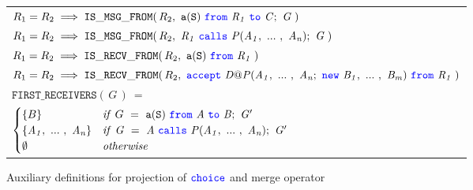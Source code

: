 \documentclass[12pt,twoside]{report}
\begin{document}
\begin{figure}[h!]
    \begin{center}
        \begin{tabular}{l}






            $R_1 = R_2 \implies \mathtt{IS\_MSG\_FROM}(\,R_2,\ \contG{\messageG{a}{S}{R_1}{C}}{G}\;)$\\[7pt]

            $R_1 = R_2 \implies \mathtt{IS\_MSG\_FROM}(\,R_2,\ \contG{\callsG{R_1}{P}{A}}{G}\;)$\\[14pt]

            $R_1 = R_2 \implies \mathtt{IS\_RECV\_FROM}(\,R_2,\ \messageFromL{a}{S}{R_1}\;)$\\[7pt]

            $R_1 = R_2 \implies \mathtt{IS\_RECV\_FROM}(\,R_2,\ \acceptL{D@P}{A}{B}{R_1}\;)$\\[14pt]

            $\mathtt{FIRST\_RECEIVERS}(\,G\,)\ =$\\

            \begin{math}
                \begin{cases}
                    \{B\} & \mathit{if}\ G\ =\ \scrmessage{a}{S}\ \from\ \mathit{A}\ \scrto\ \mathit{B};\ \mathit{G'}\\
                    \{\roles{A}{n}\} & \mathit{if}\ \mathit{G}\ =\ \mathit{A}\ \calls\ \mathit{P}(\roles{A}{n});\ \mathit{G'}\\
                    \emptyset & \mathit{otherwise}
                \end{cases}
            \end{math}
        \end{tabular}
    \end{center}
    \caption{Auxiliary definitions for projection of ${\color{blue}\mathtt{choice}}$ and merge operator}
    \label{scribble-choice-aux-predicates}
\end{figure}
\end{document}
